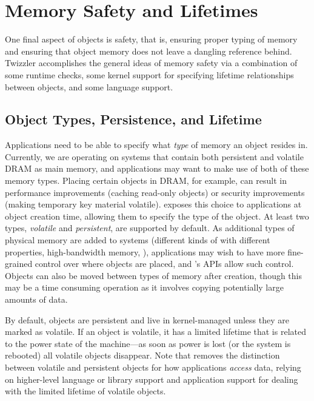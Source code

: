 \section{Memory Safety and Lifetimes}

One final aspect of objects is safety, that is, ensuring proper typing of memory and ensuring that object memory does
not leave a dangling reference behind. Twizzler accomplishes the general ideas of memory safety via a combination of
some runtime checks, some kernel support for specifying lifetime relationships between objects, and some language
support.

\subsection{Object Types, Persistence, and Lifetime}

Applications need to be able to specify what \emph{type} of memory an object resides in. Currently,
we are operating on systems that contain both persistent \NVM and volatile DRAM as main memory, and
applications may want to make use of both of these memory types. Placing certain objects in DRAM,
for example, can result in performance improvements (\eg caching read-only objects) or security
improvements (\eg making temporary key material volatile). \Twizzler exposes this choice to
applications at object creation time, allowing them to specify the type of the object. At least two
types, \emph{volatile} and \emph{persistent}, are supported by default. As additional types of physical memory
are added to systems (\eg different kinds of \NVM with different properties, high-bandwidth memory,
\etc), applications may wish to have more fine-grained control over where objects are placed, and
\Twizzler's APIs allow such control. Objects can also be moved between types of memory after
creation, though this may be a time consuming operation as it involves copying potentially large
amounts of data.

By default, objects are persistent and live in kernel-managed \NVM unless they are marked as
volatile. If an object is volatile, it has a limited lifetime that is related to the power state of
the machine---as soon as power is lost (or the system is rebooted) all volatile objects disappear.
Note that \Twizzler removes the distinction between volatile and persistent objects for how
applications \emph{access} data, relying on higher-level language or library support and application
support for dealing with the limited lifetime of volatile objects.


